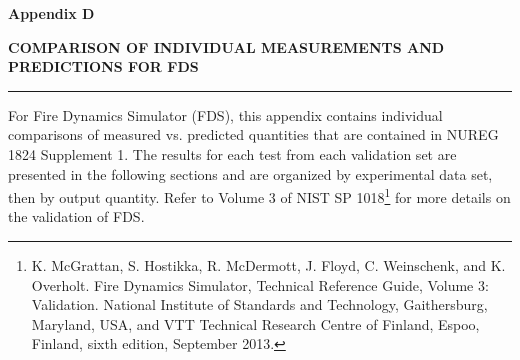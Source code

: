 \documentclass[12pt, titlepage, twoside]{article}
\begin{document}
\thispagestyle{empty}

\huge
\noindent \textbf{Appendix D}

\vspace{0.5em}
\LARGE
\noindent \textbf{COMPARISON OF INDIVIDUAL MEASUREMENTS AND PREDICTIONS FOR FDS}

\normalsize

\vspace{1.5em}
\hrule
\vspace{1.0em}

For Fire Dynamics Simulator (FDS), this appendix contains individual comparisons of measured vs. predicted quantities that are contained in NUREG 1824 Supplement 1. The results for each test from each validation set are presented in the following sections and are organized by experimental data set, then by output quantity. Refer to Volume 3 of NIST SP 1018\footnote{K. McGrattan, S. Hostikka, R. McDermott, J. Floyd, C. Weinschenk, and K. Overholt. Fire Dynamics Simulator, Technical Reference Guide, Volume 3: Validation. National Institute of Standards and Technology, Gaithersburg, Maryland, USA, and VTT Technical Research Centre of Finland, Espoo, Finland, sixth edition, September 2013.} for more details on the validation of FDS.

\clearpage
{}
\thispagestyle{empty}
\tableofcontents

\appendix

\setcounter{section}{3}


\end{document}
